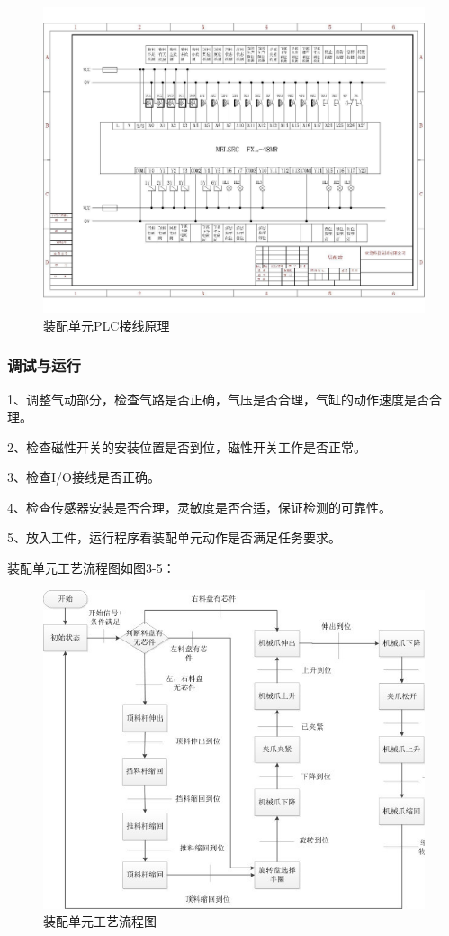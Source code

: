 \documentclass[12pt]{article}
\begin{document}
\begin{figure}[htbp]
    \centering
    \includegraphics[scale=0.3]{fig/3-4.jpg}
    \caption{装配单元PLC接线原理}
\end{figure} 

\subsubsection{调试与运行}
1、调整气动部分，检查气路是否正确，气压是否合理，气缸的动作速度是否合理。 

2、检查磁性开关的安装位置是否到位，磁性开关工作是否正常。 

3、检查I/O接线是否正确。

4、检查传感器安装是否合理，灵敏度是否合适，保证检测的可靠性。

5、放入工件，运行程序看装配单元动作是否满足任务要求。

装配单元工艺流程图如图3-5：
\begin{figure}[htbp]
    \centering
    \includegraphics[scale=0.9]{fig/工艺流程.jpg}
    \caption{装配单元工艺流程图}
\end{figure} 
\end{document}
